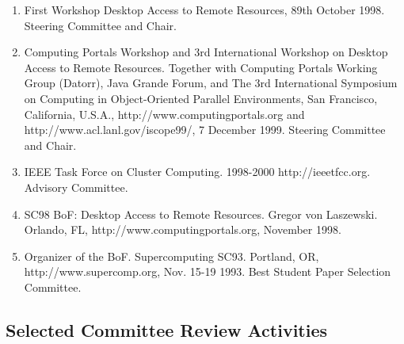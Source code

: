 \documentclass{article}
\begin{document}
\begin{enumerate}
\item  First Workshop Desktop Access to Remote Resources, 89th October 1998. Steering Committee and Chair. 
\item  Computing Portals Workshop and 3rd International Workshop on Desktop Access to Remote Resources. Together with Computing Portals Working Group (Datorr), Java Grande Forum, and The 3rd International Symposium on Computing in Object-Oriented Parallel Environments, San Francisco, California, U.S.A., http://www.computingportals.org and http://www.acl.lanl.gov/iscope99/, 7 December 1999. Steering Committee and Chair. 
\item  IEEE Task Force on Cluster Computing. 1998-2000 http://ieeetfcc.org. Advisory Committee. 
\item  SC98 BoF: Desktop Access to Remote Resources.  Gregor von Laszewski. Orlando, FL, http://www.computingportals.org, November 1998. 
\item  Organizer of the BoF. Supercomputing  SC93. Portland, OR, http://www.supercomp.org, Nov. 15-19 1993. Best Student Paper Selection Committee. 
\end{enumerate}
    
\subsection{Selected Committee Review Activities}
\end{document}
